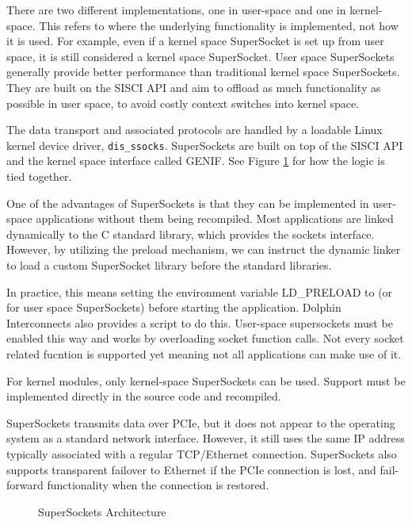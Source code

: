 There are two different implementations, one in user-space and one in kernel-space. This refers to where the underlying functionality is implemented, not how it is used. For example, even if a kernel space SuperSocket is set up from user space, it is still considered a kernel space SuperSocket. User space SuperSockets generally provide better performance than traditional kernel space SuperSockets. They are built on the SISCI API and aim to offload as much functionality as possible in user space, to avoid costly context switches into kernel space.

The data transport and associated protocols are handled by a loadable Linux kernel device driver, \texttt{dis\_ssocks}. SuperSockets are built on top of the SISCI API and the kernel space interface called GENIF. See Figure \ref{fig:ssocks_stack} for how the logic is tied together.

One of the advantages of SuperSockets is that they can be implemented in user-space applications without them being recompiled. Most applications are linked dynamically to the C standard library, which provides the sockets interface. However, by utilizing the preload mechanism, we can instruct the dynamic linker to load a custom SuperSocket library before the standard libraries.

In practice, this means setting the environment variable LD\_PRELOAD to  (or  for user space SuperSockets) before starting the application. Dolphin Interconnects also provides a script to do this. User-space supersockets must be enabled this way and works by overloading socket function calls. Not every socket related fucntion is supported yet meaning not all applications can make use of it.

For kernel modules, only kernel-space SuperSockets can be used. Support must be implemented directly in the source code and recompiled.

SuperSockets transmits data over PCIe, but it does not appear to the operating system as a standard network interface. However, it still uses the same IP address typically associated with a regular TCP/Ethernet connection. SuperSockets also supports transparent failover to Ethernet if the PCIe connection is lost, and fail-forward functionality when the connection is restored.
 
\begin{figure}[H]
    \centering
    
    \caption[SuperSockets Architecture]{SuperSockets Architecture}

    \label{fig:ssocks_stack}
\end{figure}

